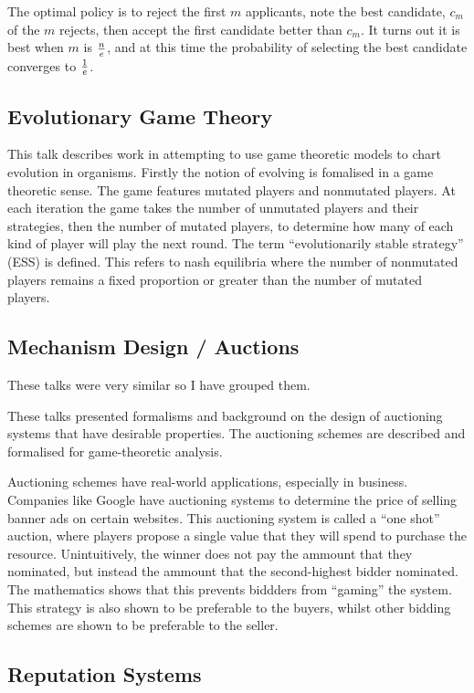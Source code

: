 \documentclass{article}
\begin{document}
The optimal policy is to reject the first $m$ applicants, note the best candidate, $c_m$ of the $m$ rejects, then accept the first candidate better than $c_m$.
It turns out it is best when $m$ is $n \over e$, and at this time the probability of selecting the best candidate converges to $1 \over e$.

\subsection{Evolutionary Game Theory}

This talk describes work in attempting to use game theoretic models to chart evolution in organisms.
Firstly the notion of evolving is fomalised in a game theoretic sense.
The game features mutated players and nonmutated players.
At each iteration the game takes the number of unmutated players and their strategies, then the number of mutated players, to determine how many of each kind of player will play the next round.
The term ``evolutionarily stable strategy'' (ESS) is defined.
This refers to nash equilibria where the number of nonmutated players remains a fixed proportion or greater than the number of mutated players.

\subsection{Mechanism Design / Auctions}

These talks were very similar so I have grouped them.

These talks presented formalisms and background on the design of auctioning systems that have desirable properties.
The auctioning schemes are described and formalised for game-theoretic analysis.

Auctioning schemes have real-world applications, especially in business.
Companies like Google have auctioning systems to determine the price of selling banner ads on certain websites.
This auctioning system is called a ``one shot'' auction, where players propose a single value that they will spend to purchase the resource.
Unintuitively, the winner does not pay the ammount that they nominated, but instead the ammount that the second-highest bidder nominated.
The mathematics shows that this prevents biddders from ``gaming'' the system.
This strategy is also shown to be preferable to the buyers, whilst other bidding schemes are shown to be preferable to the seller.

\subsection{Reputation Systems}
\end{document}
